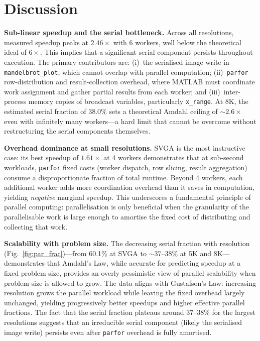 \documentclass[conference]{IEEEtran}
\begin{document}
\section{Discussion}

\textbf{Sub-linear speedup and the serial bottleneck.}
Across all resolutions, measured speedup peaks at $2.46\times$ with 6
workers, well below the theoretical ideal of $6\times$.  This implies that
a significant serial component persists throughout execution.  The primary
contributors are: (i)~the serialised image write in
\texttt{mandelbrot\_plot}, which cannot overlap with parallel computation;
(ii)~\texttt{parfor} row-distribution and result-collection overhead, where
MATLAB must coordinate work assignment and gather partial results from each
worker; and (iii)~inter-process memory copies of broadcast variables,
particularly \texttt{x\_range}.  At 8K, the estimated serial fraction of
38.0\% sets a theoretical Amdahl ceiling of ${\sim}2.6\times$ even with
infinitely many workers---a hard limit that cannot be overcome without
restructuring the serial components themselves.

\textbf{Overhead dominance at small resolutions.}
SVGA is the most instructive case: its best speedup of $1.61\times$ at 4
workers demonstrates that at sub-second workloads, \texttt{parfor} fixed
costs (worker dispatch, row slicing, result aggregation) consume a
disproportionate fraction of total runtime.  Beyond 4 workers, each
additional worker adds more coordination overhead than it saves in
computation, yielding \emph{negative} marginal speedup.  This underscores
a fundamental principle of parallel computing: parallelisation is only
beneficial when the granularity of the parallelisable work is large enough
to amortise the fixed cost of distributing and collecting that work.

\textbf{Scalability with problem size.}
The decreasing serial fraction with resolution
(Fig.~\ref{fig:par_frac})---from 60.1\% at SVGA to ${\sim}37\text{--}38\%$
at 5K and 8K---demonstrates that Amdahl's Law, while accurate for predicting
speedup at a fixed problem size, provides an overly pessimistic view of
parallel scalability when problem size is allowed to grow.  The data aligns
with Gustafson's Law: increasing resolution grows the parallel workload
while leaving the fixed overhead largely unchanged, yielding progressively
better speedups and higher effective parallel fractions.  The fact that the
serial fraction plateaus around 37--38\% for the largest resolutions
suggests that an irreducible serial component (likely the serialised image
write) persists even after \texttt{parfor} overhead is fully amortised.
\end{document}
